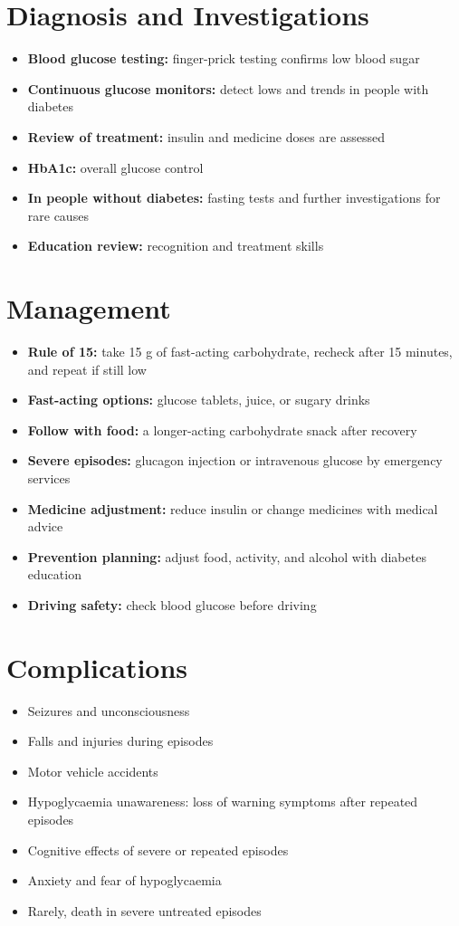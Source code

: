 \section*{Diagnosis and Investigations}
\begin{itemize}
    \item \textbf{Blood glucose testing:} finger-prick testing confirms low blood sugar
    \item \textbf{Continuous glucose monitors:} detect lows and trends in people with diabetes
    \item \textbf{Review of treatment:} insulin and medicine doses are assessed
    \item \textbf{HbA1c:} overall glucose control
    \item \textbf{In people without diabetes:} fasting tests and further investigations for rare causes
    \item \textbf{Education review:} recognition and treatment skills
\end{itemize}

\section*{Management}
\begin{itemize}
    \item \textbf{Rule of 15:} take 15 g of fast-acting carbohydrate, recheck after 15 minutes, and repeat if still low
    \item \textbf{Fast-acting options:} glucose tablets, juice, or sugary drinks
    \item \textbf{Follow with food:} a longer-acting carbohydrate snack after recovery
    \item \textbf{Severe episodes:} glucagon injection or intravenous glucose by emergency services
    \item \textbf{Medicine adjustment:} reduce insulin or change medicines with medical advice
    \item \textbf{Prevention planning:} adjust food, activity, and alcohol with diabetes education
    \item \textbf{Driving safety:} check blood glucose before driving
\end{itemize}

\section*{Complications}
\begin{itemize}
    \item Seizures and unconsciousness
    \item Falls and injuries during episodes
    \item Motor vehicle accidents
    \item Hypoglycaemia unawareness: loss of warning symptoms after repeated episodes
    \item Cognitive effects of severe or repeated episodes
    \item Anxiety and fear of hypoglycaemia
    \item Rarely, death in severe untreated episodes
\end{itemize}

